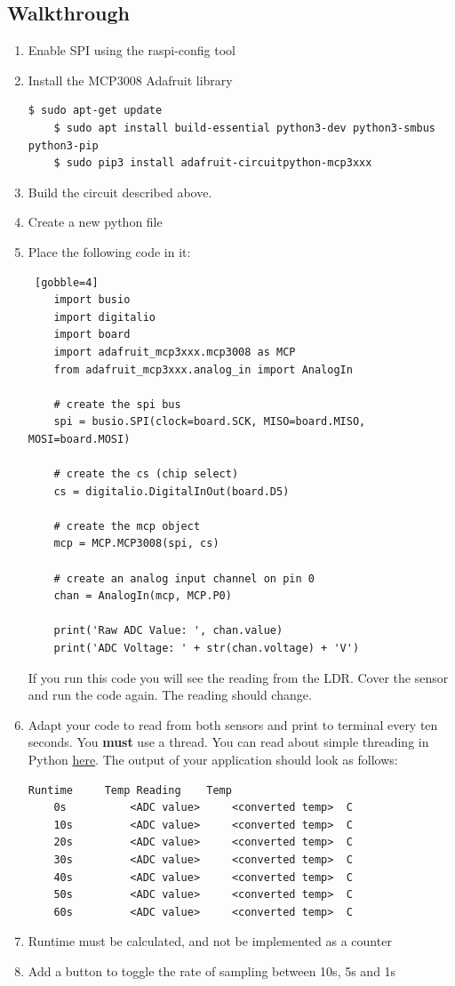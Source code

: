 \subsection{Walkthrough}
\begin{enumerate}
    \item Enable SPI using the raspi-config tool
    \item Install the MCP3008 Adafruit library
    \begin{lstlisting}[gobble=4]
    $ sudo apt-get update
    $ sudo apt install build-essential python3-dev python3-smbus python3-pip
    $ sudo pip3 install adafruit-circuitpython-mcp3xxx
    \end{lstlisting}
    \item Build the circuit described above.
    \item Create a new python file
    \item Place the following code in it:
    \begin{lstlisting} [gobble=4]
    import busio
    import digitalio
    import board
    import adafruit_mcp3xxx.mcp3008 as MCP
    from adafruit_mcp3xxx.analog_in import AnalogIn

    # create the spi bus
    spi = busio.SPI(clock=board.SCK, MISO=board.MISO, MOSI=board.MOSI)

    # create the cs (chip select)
    cs = digitalio.DigitalInOut(board.D5)

    # create the mcp object
    mcp = MCP.MCP3008(spi, cs)

    # create an analog input channel on pin 0
    chan = AnalogIn(mcp, MCP.P0)

    print('Raw ADC Value: ', chan.value)
    print('ADC Voltage: ' + str(chan.voltage) + 'V')
    \end{lstlisting}
    If you run this code you will see the reading from the LDR. Cover the sensor and run the code again. The reading should change.
    \item Adapt your code to read from both sensors and print to terminal every ten seconds. You \textbf{must} use a thread. You can read about simple threading in Python \href{http://wiki.ee.uct.ac.za/RaspberryPi:ProgrammingInPython}{here}. The output of your application should look as follows:
    \begin{lstlisting}[gobble=4]
    Runtime     Temp Reading    Temp	
    0s          <ADC value>	    <converted temp>  C
    10s         <ADC value>	    <converted temp>  C
    20s         <ADC value>	    <converted temp>  C
    30s         <ADC value>	    <converted temp>  C
    40s         <ADC value>	    <converted temp>  C
    50s         <ADC value>	    <converted temp>  C
    60s         <ADC value>	    <converted temp>  C
    \end{lstlisting}
    \item Runtime must be calculated, and not be implemented as a counter
    \item Add a button to toggle the rate of sampling between 10s, 5s and 1s
\end{enumerate}

